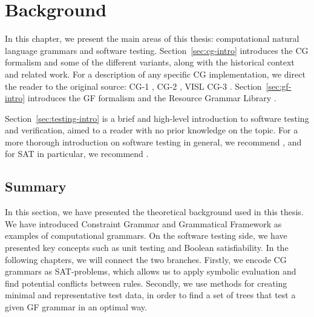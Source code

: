\chapter{Background}

In this chapter, we present the main areas of this thesis: computational natural language grammars and software testing.
Section~\ref{sec:cg-intro} introduces the CG formalism and some of the different variants, along with the historical context and related work.
For a description of any specific CG implementation, we direct the reader to the original source: CG-1 \cite{karlsson1990cgp,karlsson1995constraint}, CG-2 \cite{tapanainen1996}, VISL CG-3 \cite{bick2015,vislcg3}.
Section~\ref{sec:gf-intro} introduces the GF formalism \cite{ranta2011gfbook} and the Resource Grammar Library \cite{ranta2009rgl}.

Section~\ref{sec:testing-intro} is a brief and high-level introduction to software testing and verification, aimed to a reader with no prior knowledge on the topic. For a more thorough introduction on software testing in general, we recommend , and for SAT in particular, we recommend \cite{biere2009handbook}.






\section{Summary}

In this section, we have presented the theoretical background used in this thesis. 
We have introduced Constraint Grammar and Grammatical Framework as examples of computational grammars.
On the software testing side, we have presented key concepts such as unit testing and 
Boolean satisfiability. %
In the following chapters, we will connect the two branches. Firstly, we encode CG grammars as SAT-problems, which allows us to apply symbolic evaluation and find potential conflicts between rules. 
Secondly, we use methods for creating minimal and representative test data, in order to find a set of trees that test a given GF grammar in an optimal way.



